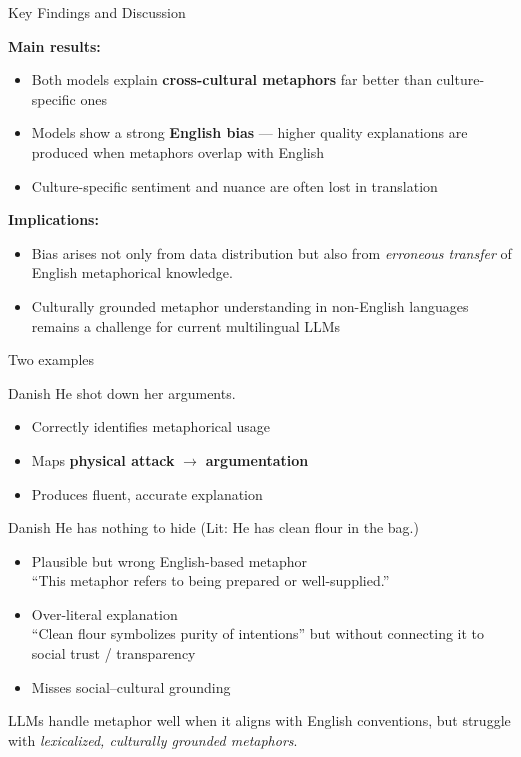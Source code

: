 \documentclass[xetex]{beamer}
\begin{document}
\begin{frame}{Key Findings and Discussion}

\textbf{Main results:}
\begin{itemize}
  \item Both models explain \textbf{cross-cultural metaphors} far better than culture-specific ones
  \item Models show a strong \textbf{English bias} — higher quality explanations are produced when metaphors overlap with English
  \item Culture-specific sentiment and nuance are often lost in translation
\end{itemize}

\medskip
\textbf{Implications:}
\begin{itemize}
  \item Bias arises not only from data distribution but also from \emph{erroneous transfer} of English metaphorical knowledge. 
  \item Culturally grounded metaphor understanding in non-English languages remains a challenge for current multilingual LLMs
\end{itemize}

\end{frame}

\begin{frame}{Two examples}
   \begin{exe}
     \ex {} \hfill Danish
     \trans He shot down her arguments.
   \end{exe}
  \begin{itemize}
  \item Correctly identifies metaphorical usage
  \item Maps \textbf{physical attack} $\rightarrow$ \textbf{argumentation}
  \item Produces fluent, accurate explanation
  \end{itemize}

  \begin{exe}
    \ex {} \hfill Danish
    \trans He has nothing to hide (Lit: He has clean flour in the bag.)
  \end{exe}
  \begin{itemize}
  \item Plausible but wrong English-based metaphor
    \\ “This metaphor refers to being prepared or well-supplied.”
  \item Over-literal explanation
    \\ “Clean flour symbolizes purity of intentions”
    but without connecting it to social trust / transparency
  \item Misses social–cultural grounding
  \end{itemize}
LLMs handle metaphor well when it aligns with English conventions,  
but struggle with \emph{lexicalized, culturally grounded metaphors}.

\end{frame}
\end{document}
